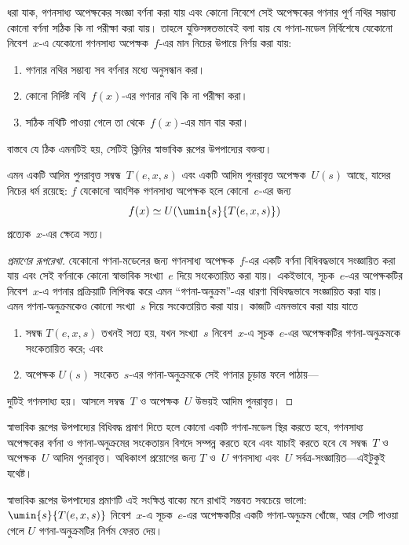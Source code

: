 \documentclass[../../../include/open-logic-section]{subfiles}
\begin{document}

ধরা যাক, গণনসাধ্য অপেক্ষকের সংজ্ঞা বর্ণনা করা যায় এবং কোনো নিবেশে সেই
অপেক্ষকের গণনার পূর্ণ নথির সম্ভাব্য কোনো বর্ণনা সঠিক কি না পরীক্ষা করা
যায়। তাহলে যুক্তিসঙ্গতভাবেই বলা যায় যে গণনা-মডেল নির্বিশেষে যেকোনো
নিবেশ~$x$-এ যেকোনো গণনসাধ্য অপেক্ষক~$f$-এর মান নিচের উপায়ে নির্ণয় করা
যায়:
\begin{enumerate}
  \item গণনার নথির সম্ভাব্য সব বর্ণনার মধ্যে অনুসন্ধান করা।
  \item কোনো নির্দিষ্ট নথি~$f(x)$-এর গণনার নথি কি না পরীক্ষা করা।
  \item সঠিক নথিটি পাওয়া গেলে তা থেকে~$f(x)$-এর মান বার করা।
\end{enumerate}
বাস্তবে যে ঠিক এমনটিই হয়, সেটিই ক্লিনির স্বাভাবিক রূপের উপপাদ্যের
বক্তব্য।

\begin{thm}[ক্লিনির স্বাভাবিক রূপের উপপাদ্য]
এমন একটি আদিম পুনরাবৃত্ত সম্বন্ধ~$T(e, x, s)$ এবং একটি আদিম পুনরাবৃত্ত
অপেক্ষক~$U(s)$ আছে, যাদের নিচের ধর্ম রয়েছে: $f$ যেকোনো আংশিক গণনসাধ্য
অপেক্ষক হলে কোনো~$e$-এর জন্য
\[
f(x) \simeq U(\umin{s}{T(e, x, s)})
\]
প্রত্যেক~$x$-এর ক্ষেত্রে সত্য।
\end{thm}

\begin{proof}[প্রমাণের রূপরেখা]
যেকোনো গণনা-মডেলের জন্য গণনসাধ্য অপেক্ষক~$f$-এর একটি বর্ণনা বিধিবদ্ধভাবে
সংজ্ঞায়িত করা যায় এবং সেই বর্ণনাকে কোনো স্বাভাবিক সংখ্যা~$e$ দিয়ে
সংকেতায়িত করা যায়। একইভাবে, সূচক~$e$-এর অপেক্ষকটির নিবেশ~$x$-এ গণনার
প্রক্রিয়াটি লিপিবদ্ধ করে এমন “গণনা-অনুক্রম”-এর ধারণা বিধিবদ্ধভাবে
সংজ্ঞায়িত করা যায়। এমন গণনা-অনুক্রমকেও কোনো সংখ্যা~$s$ দিয়ে সংকেতায়িত
করা যায়। কাজটি এমনভাবে করা যায় যাতে
\begin{enumerate}
  \item সম্বন্ধ $T(e, x, s)$ তখনই সত্য হয়, যখন সংখ্যা~$s$ নিবেশ~$x$-এ
  সূচক~$e$-এর অপেক্ষকটির গণনা-অনুক্রমকে সংকেতায়িত করে; এবং
  \item অপেক্ষক $U(s)$ সংকেত~$s$-এর গণনা-অনুক্রমকে সেই গণনার চূড়ান্ত
  ফলে পাঠায়—
\end{enumerate}
দুটিই গণনসাধ্য হয়। আসলে সম্বন্ধ~$T$ ও অপেক্ষক~$U$ উভয়ই আদিম পুনরাবৃত্ত।
\end{proof}

\begin{explain}
স্বাভাবিক রূপের উপপাদ্যের বিধিবদ্ধ প্রমাণ দিতে হলে কোনো একটি গণনা-মডেল
স্থির করতে হবে, গণনসাধ্য অপেক্ষকের বর্ণনা ও গণনা-অনুক্রমের সংকেতায়ন
বিশদে সম্পন্ন করতে হবে এবং যাচাই করতে হবে যে সম্বন্ধ~$T$ ও অপেক্ষক~$U$
আদিম পুনরাবৃত্ত। অধিকাংশ প্রয়োগের জন্য $T$ ও~$U$ গণনসাধ্য এবং~$U$
সর্বত্র-সংজ্ঞায়িত—এইটুকুই যথেষ্ট।

স্বাভাবিক রূপের উপপাদ্যের প্রমাণটি এই সংক্ষিপ্ত বাক্যে মনে রাখাই সম্ভবত
সবচেয়ে ভালো: $\umin{s}{T(e, x, s)}$ নিবেশ~$x$-এ সূচক~$e$-এর অপেক্ষকটির
একটি গণনা-অনুক্রম খোঁজে, আর সেটি পাওয়া গেলে $U$ গণনা-অনুক্রমটির নির্গম
ফেরত দেয়।
\end{explain}
\end{document}
